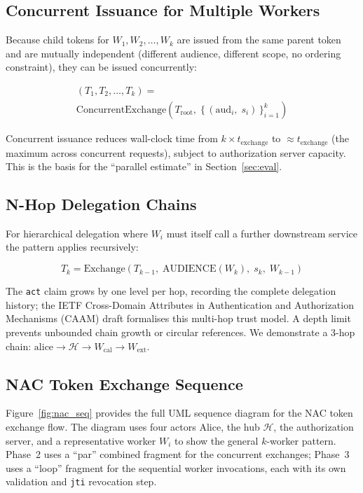 \documentclass[journal]{IEEEtran}
\begin{document}
\subsection{Concurrent Issuance for Multiple Workers}

Because child tokens for $W_1, W_2, \ldots, W_k$ are issued from the same parent
token and are mutually independent (different audience, different scope, no
ordering constraint), they can be issued concurrently:

\begin{multline}
(T_1, T_2, \ldots, T_k) = \\
\mathrm{ConcurrentExchange}\!\left(
  T_{\mathrm{root}},\;
  \bigl\{\,(\mathrm{aud}_i,\; s_i)\,\bigr\}_{i=1}^{k}
\right)
\label{eq:concurrent}
\end{multline}

Concurrent issuance reduces wall-clock time from $k \times t_{\mathrm{exchange}}$
to $\approx t_{\mathrm{exchange}}$ (the maximum across concurrent requests),
subject to authorization server capacity. This is the basis for the
``parallel estimate'' in Section~\ref{sec:eval}.

\subsection{N-Hop Delegation Chains}

For hierarchical delegation where $W_i$ must itself call a further downstream
service the pattern applies recursively:

\begin{equation}
T_k = \mathrm{Exchange}(T_{k-1},\;
  \mathrm{AUDIENCE}(W_k),\; s_k,\; W_{k-1})
\label{eq:nhop}
\end{equation}

The \texttt{act} claim grows by one level per hop, recording the complete
delegation history; the IETF Cross-Domain Attributes in Authentication and
Authorization Mechanisms (CAAM) draft \cite{ietf_caam} formalises this
multi-hop trust model. A depth limit prevents unbounded chain growth or
circular references. We demonstrate a 3-hop chain:
$\text{alice} \to \mathcal{H} \to W_{\mathrm{cal}} \to W_{\mathrm{ext}}$.

\subsection{NAC Token Exchange Sequence}

Figure~\ref{fig:nac_seq} provides the full UML sequence diagram for the NAC
token exchange flow. The diagram uses four actors Alice, the hub
$\mathcal{H}$, the authorization server, and a representative worker
$W_i$ to show the general $k$-worker pattern. Phase~2 uses a ``par''
combined fragment for the concurrent exchanges; Phase~3 uses a ``loop''
fragment for the sequential worker invocations, each with its own
validation and \texttt{jti} revocation step.
\end{document}
